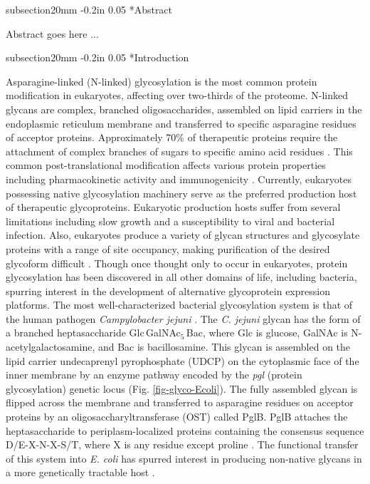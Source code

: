 \documentclass[12pt]{article}
\makeatletter
\renewcommand\section{\@startsection
	{subsection}{2}{0mm}
	{-0.2in}
	{0.05\baselineskip}
	{\normalfont\large\bfseries}}
\makeatother
\begin{document}
\section*{Abstract}

Abstract goes here ...

\newpage
\setcounter{page}{1}
\linenumbers
\section*{Introduction}

Asparagine-linked (N-linked) glycosylation is the most common protein modification in eukaryotes, affecting over two-thirds of the proteome. 
N-linked glycans are complex, branched oligosaccharides, assembled on lipid carriers in the endoplasmic reticulum membrane and transferred to specific asparagine residues of acceptor proteins. 
Approximately 70\% of therapeutic proteins require the attachment of complex branches of sugars to specific amino acid residues \cite{2013-merritt-fisher-delisa-BiotechBioeng}. 
This common post-translational modification affects various protein properties including pharmacokinetic activity and immunogenicity \cite{2010-sola-griebenow-Biodrugs}. 
Currently, eukaryotes possessing native glycosylation machinery serve as the preferred production host of therapeutic glycoproteins. 
Eukaryotic production hosts suffer from several limitations including slow growth and a susceptibility to viral and bacterial infection. 
Also, eukaryotes produce a variety of glycan structures and glycosylate proteins with a range of site occupancy, making purification of the desired glycoform difficult \cite{2013-merritt-fisher-delisa-BiotechBioeng}. 
Though once thought only to occur in eukaryotes, protein glycosylation has been discovered in all other domains of life, including bacteria, spurring interest in the development of alternative glycoprotein expression platforms. 
The most well-characterized bacterial glycosylation system is that of the human pathogen \textit{Campylobacter jejuni} \cite{1999-szymanski-guerry-MolMicrob}. 
The \textit{C. jejuni} glycan has the form of a branched heptasaccharide Glc$\,$GalNAc$_5$$\,$Bac, where Glc is glucose, GalNAc is N-acetylgalactosamine, and Bac is bacillosamine. 
This glycan is assembled on the lipid carrier undecaprenyl pyrophosphate (UDCP) on the cytoplasmic face of the inner membrane by an enzyme pathway encoded by the \textit{pgl} (protein glycosylation) genetic locus (Fig. \ref{fig-glyco-Ecoli}). 
The fully assembled glycan is flipped across the membrane and transferred to asparagine residues on acceptor proteins by an oligosaccharyltransferase (OST) called PglB. 
PglB attaches the heptasaccharide to periplasm-localized proteins containing the consensus sequence D/E-X-N-X-S/T, where X is any residue except proline \cite{2011-fisher-haitjema-delisa-AppEnvMicrobio}. 
The functional transfer of this system into \textit{E. coli} has spurred interest in producing non-native glycans in a more genetically tractable host \cite{1999-szymanski-guerry-MolMicrob,2002-wacker-aebi-Sci}. 
\end{document}
